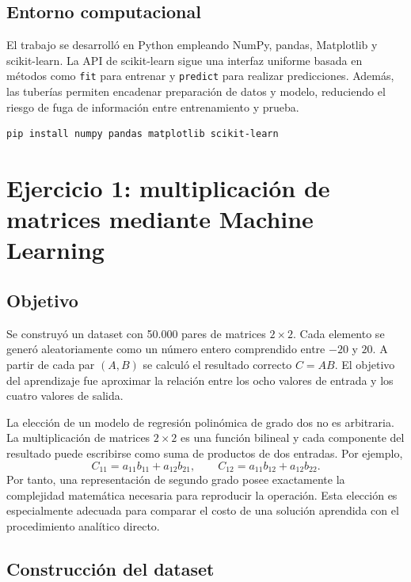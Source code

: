 \documentclass[14pt,twoside]{article}
\begin{document}
\subsection{Entorno computacional}

El trabajo se desarrolló en Python empleando NumPy, pandas, Matplotlib y scikit-learn. La API de scikit-learn sigue una interfaz uniforme basada en métodos como \texttt{fit} para entrenar y \texttt{predict} para realizar predicciones. Además, las tuberías permiten encadenar preparación de datos y modelo, reduciendo el riesgo de fuga de información entre entrenamiento y prueba. \cite{sklearnGettingStarted}

\begin{lstlisting}[style=pgterminal,caption={Instalación de las bibliotecas utilizadas.}]
pip install numpy pandas matplotlib scikit-learn
\end{lstlisting}

\section{Ejercicio 1: multiplicación de matrices mediante Machine Learning}

\subsection{Objetivo}

Se construyó un dataset con 50.000 pares de matrices $2\times2$. Cada elemento se generó aleatoriamente como un número entero comprendido entre $-20$ y $20$. A partir de cada par $(A,B)$ se calculó el resultado correcto $C=A B$. El objetivo del aprendizaje fue aproximar la relación entre los ocho valores de entrada y los cuatro valores de salida.

La elección de un modelo de regresión polinómica de grado dos no es arbitraria. La multiplicación de matrices $2\times2$ es una función bilineal y cada componente del resultado puede escribirse como suma de productos de dos entradas. Por ejemplo,
\[
C_{11}=a_{11}b_{11}+a_{12}b_{21},
\qquad
C_{12}=a_{11}b_{12}+a_{12}b_{22}.
\]
Por tanto, una representación de segundo grado posee exactamente la complejidad matemática necesaria para reproducir la operación. Esta elección es especialmente adecuada para comparar el costo de una solución aprendida con el procedimiento analítico directo.

\subsection{Construcción del dataset}
\end{document}
